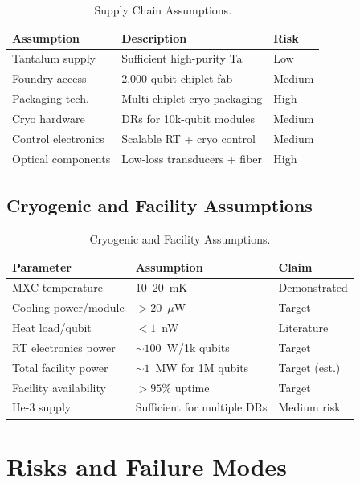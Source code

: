 \documentclass[conference]{IEEEtran}
\begin{document}
\begin{table}[htbp]
\centering
\caption{Supply Chain Assumptions.}
\label{tab:supply}
\begin{tabular}{lp{3cm}l}
\toprule
\textbf{Assumption} & \textbf{Description} & \textbf{Risk} \\
\midrule
Tantalum supply & Sufficient high-purity Ta & Low \\
Foundry access & 2,000-qubit chiplet fab & Medium \\
Packaging tech. & Multi-chiplet cryo packaging & High \\
Cryo hardware & DRs for 10k-qubit modules & Medium \\
Control electronics & Scalable RT + cryo control & Medium \\
Optical components & Low-loss transducers + fiber & High \\
\bottomrule
\end{tabular}
\end{table}

\subsection{Cryogenic and Facility Assumptions}

\begin{table}[htbp]
\centering
\caption{Cryogenic and Facility Assumptions.}
\label{tab:cryo}
\begin{tabular}{llp{2cm}}
\toprule
\textbf{Parameter} & \textbf{Assumption} & \textbf{Claim} \\
\midrule
MXC temperature & 10--20~mK & Demonstrated \\
Cooling power/module & $> 20$~$\mu$W & Target \\
Heat load/qubit & $< 1$~nW & Literature \\
RT electronics power & ${\sim}100$~W/1k qubits & Target \\
Total facility power & ${\sim}1$~MW for 1M qubits & Target (est.) \\
Facility availability & $> 95\%$ uptime & Target \\
He-3 supply & Sufficient for multiple DRs & Medium risk \\
\bottomrule
\end{tabular}
\end{table}

\section{Risks and Failure Modes}
\end{document}
